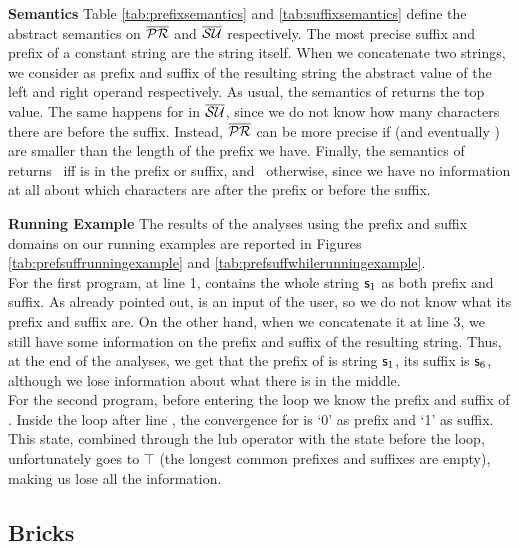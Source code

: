 \documentclass[orivec]{llncs}
\begin{document}
\noindent \textbf{Semantics} Table \ref{tab:prefixsemantics} and \ref{tab:suffixsemantics} define the abstract semantics on $\mathsf{\overline{\mathsf{\mathcal{PR}}}}$ and $\mathsf{\overline{\mathsf{\mathcal{SU}}}}$ respectively.
The most precise suffix and prefix of a constant string are the string itself. When we concatenate two strings, we consider as prefix and suffix of the resulting string the abstract value of the left and right operand respectively. As usual, the semantics of  returns the top value. The same happens for  in $\mathsf{\overline{\mathsf{\mathcal{SU}}}}$, since we do not know how many characters there are before the suffix. Instead, $\mathsf{\overline{\mathsf{\mathcal{PR}}}}$ can be more precise if  (and eventually ) are smaller than the length of the prefix we have. Finally, the semantics of  returns \true\ iff  is in the prefix or suffix, and \booltop\ otherwise, since we have no information at all about which characters are after the prefix or before the suffix.

\noindent \textbf{Running Example} The results of the analyses using the prefix and suffix domains on our running examples are reported in Figures \ref{tab:prefsuffrunningexample} and \ref{tab:prefsuffwhilerunningexample}. \\ 
For the first program, at line 1,  contains the whole string $\mathsf{s}_1$ as both prefix and suffix. As already pointed out,  is an input of the user, so we do not know what its prefix and suffix are. On the other hand, when we concatenate it at line 3, we still have some information on the prefix and suffix of the resulting string. Thus, at the end of the analyses, we get that the prefix of  is string $\mathsf{s}_1$, its suffix is $\mathsf{s}_6$, although we lose information about what there is in the middle.\\
For the second program, before entering the loop we know the prefix and suffix of . Inside the loop after line , the convergence for  is `0' as prefix and `1' as suffix. This state, combined through the lub operator with the state before the loop, unfortunately goes to $\top$ (the longest common prefixes and suffixes are empty), making us lose all the information. 

 
 
\subsection{Bricks}
 
\end{document}
